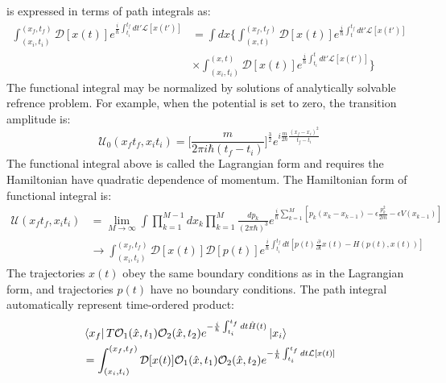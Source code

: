\documentclass[12pt]{article}
\begin{document}
is expressed in terms of path integrals as:
\begin{equation*}
    \begin{split}
        \int_{(x_i,t_i)}^{(x_f,t_f)}\mathcal{D}[x(t)]e^{\frac{i}{\hbar}
        \int_{t_i}^{t_f}dt'\mathcal{L}[x(t')]}&=\int dx\Big\{\int_{(x,t)}^{(x_f,t_f)}
        \mathcal{D}[x(t)]e^{\frac{i}{\hbar}\int_{t}^{t_f}dt'\mathcal{L}[x(t')]}\\
        &\times\int_{(x_i,t_i)}^{(x,t)}\mathcal{D}[x(t)]e^{\frac{i}{\hbar}
        \int_{t_i}^{t}dt'\mathcal{L}[x(t')]}\Big\}
    \end{split}
\end{equation*}
The functional integral may be normalized by solutions of analytically solvable 
refrence problem. For example, when the potential is set to zero, the transition 
amplitude is:
\begin{equation*}
    \mathcal{U}_0(x_ft_f,x_it_i)=\bigg[\frac{m}{2\pi i\hbar(t_f-t_i)}\bigg]^\frac{3}{2}
    e^{i\frac{m}{2\hbar}\frac{(x_f-x_i)^2}{t_f-t_i}}
\end{equation*}
The functional integral above is called the Lagrangian form and requires the 
Hamiltonian have quadratic dependence of momentum. The Hamiltonian form of functional 
integral is:
\begin{equation*}
    \begin{split}
        \mathcal{U}(x_ft_f,x_it_i)&=\lim_{M\rightarrow\infty}\int\prod_{k=1}^{M-1}dx_k
        \prod_{k=1}^M\frac{dp_k}{(2\pi\hbar)^3}e^{\frac{i}{\hbar}\sum_{k=1}^M
        [p_k(x_k-x_{k-1})-\epsilon\frac{p^2_k}{2m}-\epsilon V(x_{k-1})]}\\
        &\rightarrow\int_{(x_i,t_i)}^{(x_f,t_f)}\mathcal{D}[x(t)]\mathcal{D}[p(t)]
        e^{\frac{i}{\hbar}\int_{t_i}^{t_f}dt[p(t)\frac{\partial}{\partial t}x(t)
        -H(p(t),x(t))]}
    \end{split}
\end{equation*}
The trajectories $x(t)$ obey the same boundary conditions as in the Lagrangian form, 
and trajectories $p(t)$ have no boundary conditions. The path integral automatically 
represent time-ordered product:
\begin{equation*}
    \begin{split}
        &\bra{x_f}T\mathcal{O}_1(\hat{x},t_1)\mathcal{O}_2(\hat{x},t_2)
        e^{-\frac{i}{\hbar}\int_{t_i}^{t_f}dt\hat{H}(t)}\ket{x_i}\\
        &=\int_{(x_i,t_i)}^{(x_f,t_f)}\mathcal{D}[x(t)]\mathcal{O}_1(\hat{x},t_1)
        \mathcal{O}_2(\hat{x},t_2)
        e^{-\frac{i}{\hbar}\int_{t_i}^{t_f}dt\mathcal{L}[x(t)]}
    \end{split}
\end{equation*}
\end{document}

